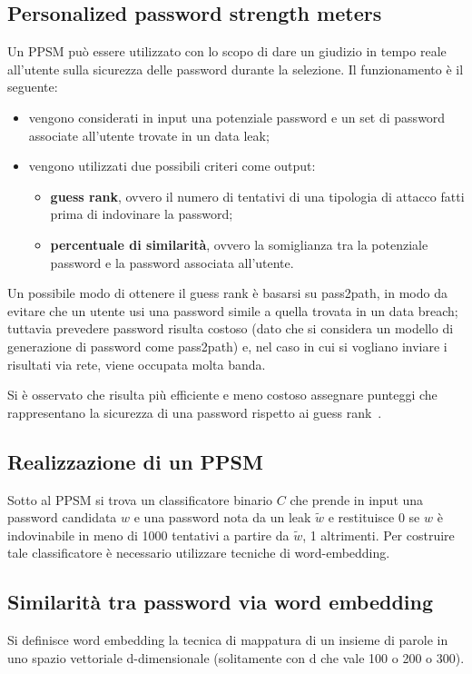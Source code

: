 \subsection{Personalized password strength meters}
\label{sec:ppsm}
Un PPSM può essere utilizzato con lo scopo di dare un giudizio in tempo reale all'utente sulla sicurezza delle password durante la selezione.
Il funzionamento è il seguente:
\begin{itemize}
    \item vengono considerati in input una potenziale password e un set di password associate all'utente trovate in un data leak;
    \item vengono utilizzati due possibili criteri come output:
    \begin{itemize}
        \item \textbf{guess rank}, ovvero il numero di tentativi di una tipologia di attacco fatti prima di indovinare la password;
        \item \textbf{percentuale di similarità}, ovvero la somiglianza tra la potenziale password e la password associata all'utente.
    \end{itemize}
\end{itemize}

Un possibile modo di ottenere il guess rank è basarsi su pass2path, in modo da evitare che un utente usi una password simile a quella trovata in un data breach; tuttavia prevedere password risulta costoso (dato che si considera un modello di generazione di password come pass2path) e, nel caso in cui si vogliano inviare i risultati via rete, viene occupata molta banda.

Si è osservato che risulta più efficiente e meno costoso assegnare punteggi che rappresentano la sicurezza di una password rispetto ai guess rank~\cite{bijeeta}.

\subsection{Realizzazione di un PPSM}
\label{sec:realizzazione ppsm}
Sotto al PPSM si trova un classificatore binario $C$ che prende in input una password candidata $w$ e una password nota da un leak $\tilde{w}$ e restituisce 0 se $w$ è indovinabile in meno di 1000 tentativi a partire da $\tilde{w}$, 1 altrimenti.
Per costruire tale classificatore è necessario utilizzare tecniche di word-embedding.

\subsection{Similarità tra password via word embedding}
\label{sec:similarita via word embedding}
Si definisce word embedding la tecnica di mappatura di un insieme di parole in uno spazio vettoriale d-dimensionale (solitamente con d che vale 100 o 200 o 300).

